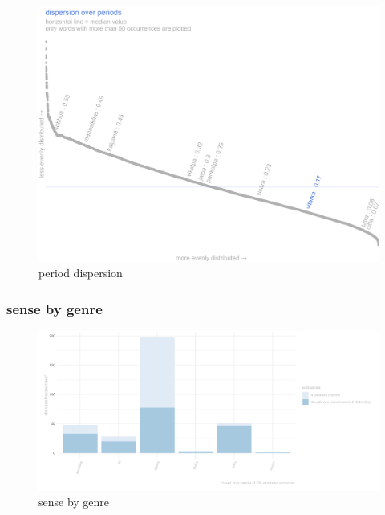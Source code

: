 \documentclass[
  letterpaper,
  DIV=11,
  numbers=noendperiod,
  oneside]{scrreprt}
\begin{document}
\begin{figure}

{\centering \includegraphics{./www/periodDP_vitarka.webp}

}

\caption{\label{fig-perioddp1}period dispersion}

\end{figure}

\hypertarget{sec-sensebygenre}{%
\subsubsection{sense by genre}\label{sec-sensebygenre}}

\begin{figure}

{\centering \includegraphics{./www/SenseByGenre_vitarka.png}

}

\caption{\label{fig-sensebygenre}sense by genre}

\end{figure}
\end{document}
